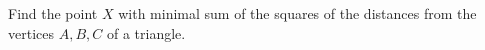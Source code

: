 Find the point $X$ with minimal sum of the squares of the distances from the vertices $A, B, C$ of a triangle.
